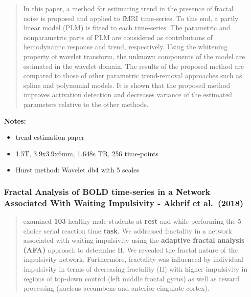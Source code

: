 \documentclass[
  sn-vancouver,
  Numbered,
  referee,
  lineno]{sn-jnl}
\providecommand{\tightlist}{%
  \setlength{\itemsep}{0pt}\setlength{\parskip}{0pt}}\usepackage{longtable,booktabs,array}
\begin{document}
\begin{quote}
In this paper, a method for estimating trend in the presence of fractal
noise is proposed and applied to fMRI time-series. To this end, a partly
linear model (PLM) is fitted to each time-series. The parametric and
nonparametric parts of PLM are considered as contributions of
hemodynamic response and trend, respectively. Using the whitening
property of wavelet transform, the unknown components of the model are
estimated in the wavelet domain. The results of the proposed method are
compared to those of other parametric trend-removal approaches such as
spline and polynomial models. It is shown that the proposed method
improves activation detection and decreases variance of the estimated
parameters relative to the other methods.
\end{quote}

\textbf{Notes:}

\begin{itemize}
\tightlist
\item
  trend estimation paper
\item
  1.5T, 3.9x3.9x6mm, 1.648s TR, 256 time-points
\item
  Hurst method: Wavelet db4 with 5 scales
\end{itemize}

\subsubsection{\texorpdfstring{Fractal Analysis of BOLD time-series in a
Network Associated With Waiting Impulsivity - Akhrif et al.~(2018)
\citep{akhrifFractalAnalysisBOLD2018}}{Fractal Analysis of BOLD time-series in a Network Associated With Waiting Impulsivity - Akhrif et al.~(2018) {[}@akhrifFractalAnalysisBOLD2018{]}}}\label{fractal-analysis-of-bold-time-series-in-a-network-associated-with-waiting-impulsivity---akhrif-et-al.-2018-akhriffractalanalysisbold2018-1}

\begin{quote}
examined \textbf{103 } healthy male students at \textbf{rest} and while
performing the 5-choice serial reaction time \textbf{task}. We addressed
fractality in a network associated with waiting impulsivity using the
\textbf{adaptive fractal analysis (AFA)} approach to determine H. We
revealed the fractal nature of the impulsivity network. Furthermore,
fractality was influenced by individual impulsivity in terms of
decreasing fractality (H) with higher impulsivity in regions of top-down
control (left middle frontal gyrus) as well as reward processing
(nucleus accumbens and anterior cingulate cortex).
\end{quote}
\end{document}
